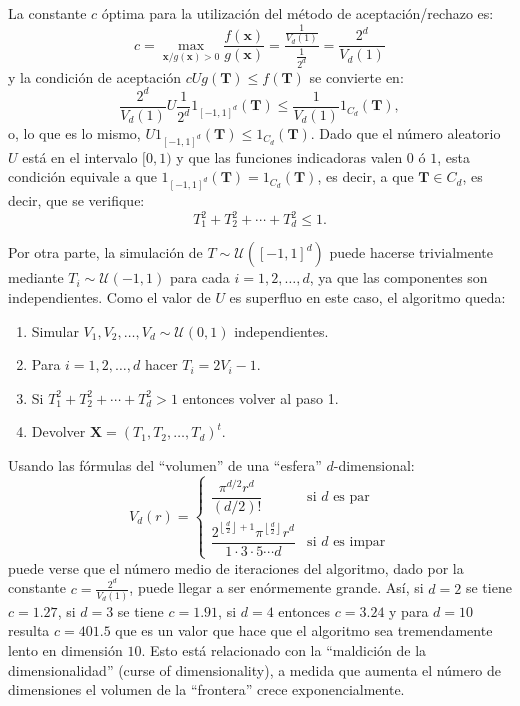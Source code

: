\documentclass[]{book}
\theoremstyle{definition}
\theoremstyle{definition}
\theoremstyle{definition}
\theoremstyle{remark}
\begin{document}
La constante \(c\) óptima para la utilización del método de
aceptación/rechazo es:
\[c=\max_{\mathbf{x}/g\left( \mathbf{x}\right) > 0}
\frac{f\left( \mathbf{x}\right)  }{g\left( \mathbf{x}\right)  }
=\frac{\frac{1}{V_d\left( 1\right)  }}{\frac{1}{2^{d}}}
=\frac{2^{d}}{V_d\left( 1\right)}\] y la condición de aceptación
\(cUg\left( \mathbf{T}\right) \leq f\left( \mathbf{T}\right)\) se
convierte en:
\[\frac{2^{d}}{V_d\left( 1\right)  }U\frac{1}{2^{d}}1_{\left[  -1,1\right]
^{d}}\left( \mathbf{T}\right)  \leq\frac{1}{V_d\left( 1\right)
}1_{C_d}\left( \mathbf{T}\right),\] o, lo que es lo mismo,
\(U1_{\left[ -1,1\right]^{d}}\left( \mathbf {T}\right) \leq1_{C_d}\left( \mathbf{T}\right)\).
Dado que el número aleatorio \(U\) está en el intervalo \([0,1)\) y que
las funciones indicadoras valen \(0\) ó \(1\), esta condición equivale a
que
\(1_{\left[ -1,1\right] ^{d}}\left( \mathbf{T}\right) =1_{C_d}\left( \mathbf{T}\right)\),
es decir, a que \(\mathbf{T}\in C_d\), es decir, que se verifique:
\[T_1^2+T_2^2+\cdots+T_d^2\leq1.\]

Por otra parte, la simulación de
\(T \sim \mathcal{U}\left( \left[ -1,1\right] ^{d}\right)\) puede
hacerse trivialmente mediante
\(T_i \sim \mathcal{U}\left( -1, 1 \right)\) para cada
\(i=1,2,\ldots,d\), ya que las componentes son independientes. Como el
valor de \(U\) es superfluo en este caso, el algoritmo queda:

\begin{enumerate}
\def\labelenumi{\arabic{enumi}.}
\item
  Simular \(V_1,V_2,\ldots,V_d \sim \mathcal{U}\left( 0,1\right)\)
  independientes.
\item
  Para \(i = 1, 2, \ldots, d\) hacer \(T_i = 2V_i - 1\).
\item
  Si \(T_1^2 + T_2^2 + \cdots + T_d^2 > 1\) entonces volver al paso 1.
\item
  Devolver \(\mathbf{X} = \left( T_1, T_2, \ldots, T_d \right)^t\).
\end{enumerate}

Usando las fórmulas del ``volumen'' de una ``esfera'' \(d\)-dimensional:
\[V_d\left( r\right)  =\left\{
\begin{array}{ll}
\dfrac{\pi^{d/2}r^{d}}{\left( d/2\right)  !} & \text{si } d \text{ es par}\\
\dfrac{2^{\left\lfloor \frac{d}{2}\right\rfloor +1}\pi^{\left\lfloor \frac{d}{2}\right\rfloor }r^{d}}{1\cdot3\cdot5\cdots d} & \text{si } d \text{ es impar}
\end{array}\right.\] puede verse que el número medio de iteraciones del
algoritmo, dado por la constante \(c=\frac{2^{d}}{V_d\left(1 \right)}\),
puede llegar a ser enórmemente grande. Así, si \(d=2\) se tiene
\(c=1.27\), si \(d=3\) se tiene \(c=1.91\), si \(d=4\) entonces
\(c=3.24\) y para \(d=10\) resulta \(c=401.5\) que es un valor que hace
que el algoritmo sea tremendamente lento en dimensión \(10\). Esto está
relacionado con la ``maldición de la dimensionalidad'' (curse of
dimensionality), a medida que aumenta el número de dimensiones el
volumen de la ``frontera'' crece exponencialmente.
\end{document}

